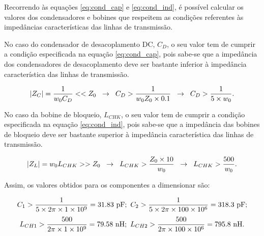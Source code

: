 \documentclass[11pt]{article}
\numberwithin{equation}{section}
\begin{document}
Recorrendo às equações \ref{eq:cond_cap} e \ref{eq:cond_ind}, é possível calcular os valores dos condensadores e bobines que respeitem as condições referentes às impedâncias características das linhas de transmissão.

No caso do condensador de desacoplamento DC, $C_{D}$, o seu valor tem de cumprir a condição especificada na equação \ref{eq:cond_cap}, pois sabe-se que a impedância dos condensadores de desacoplamento deve ser bastante inferior à impedância característica das linhas de transmissão. 

\vspace{-3mm}
\begin{equation}
	\lvert Z_C \rvert = \frac{1}{w_{0} C_{D}} << Z_0 \hspace{2mm} \rightarrow \hspace{2mm} C_{D} > \frac{1}{w_{0}Z_0 \times 0.1} \hspace{2mm} \rightarrow \hspace{2mm} C_{D} > \dfrac{1}{5 \times w_{0}}.
	\label{eq:cond_cap}
\end{equation}

\vspace{1mm}
No caso da bobine de bloqueio, $L_{CHK}$, o seu valor tem de cumprir a condição especificada na equação \ref{eq:cond_ind}, pois sabe-se que a impedância das bobines de bloqueio deve ser bastante superior à impedância característica das linhas de transmissão.  

\vspace{-3mm}
\begin{equation}
	\lvert Z_L \rvert = w_{0} L_{CHK} >> Z_0 \hspace{2mm} \rightarrow \hspace{2mm} L_{CHK} > \frac{Z_0 \times 10}{w_{0}} \hspace{2mm} \rightarrow \hspace{2mm} L_{CHK} > \frac{500}{w_{0}}.
	\label{eq:cond_ind}
\end{equation}

\vspace{1mm}

Assim, os valores obtidos para os componentes a dimensionar são:

\vspace{-3mm}
\begin{equation}
\centering
C_{1} > \frac{1}{5 \times 2 \pi \times 1 \times 10^{9}} = 31.83~\text{pF};~ C_{2} > \frac{1}{5 \times 2\pi \times 100 \times 10^{6}} = 318.3~\text{pF}; 
\end{equation}
\vspace{-3mm}
\begin{equation}
\centering
L_{CH1} > \frac{500}{2\pi \times 1 \times 10^{9}} = 79.58~\text{nH};~L_{CH2} > \frac{500}{2\pi \times 100 \times 10^{6}} = 795.8~\text{nH}.
\end{equation}
\end{document}

